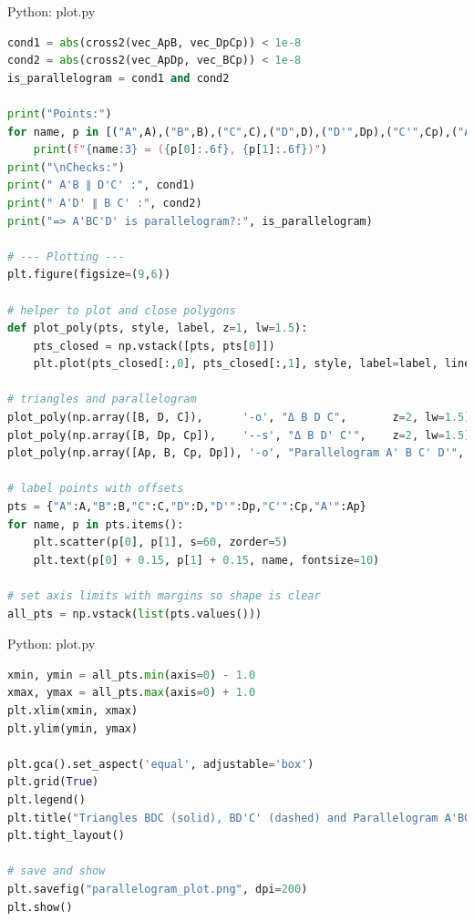\documentclass{beamer}
\numberwithin{equation}{section}
\theoremstyle{remark}
\begin{document}
\begin{frame}[fragile]{Python: plot.py}
\begin{lstlisting}[language=Python]
cond1 = abs(cross2(vec_ApB, vec_DpCp)) < 1e-8
cond2 = abs(cross2(vec_ApDp, vec_BCp)) < 1e-8
is_parallelogram = cond1 and cond2

print("Points:")
for name, p in [("A",A),("B",B),("C",C),("D",D),("D'",Dp),("C'",Cp),("A'",Ap)]:
    print(f"{name:3} = ({p[0]:.6f}, {p[1]:.6f})")
print("\nChecks:")
print(" A'B ∥ D'C' :", cond1)
print(" A'D' ∥ B C' :", cond2)
print("=> A'BC'D' is parallelogram?:", is_parallelogram)

# --- Plotting ---
plt.figure(figsize=(9,6))

# helper to plot and close polygons
def plot_poly(pts, style, label, z=1, lw=1.5):
    pts_closed = np.vstack([pts, pts[0]])
    plt.plot(pts_closed[:,0], pts_closed[:,1], style, label=label, linewidth=lw, zorder=z)

# triangles and parallelogram
plot_poly(np.array([B, D, C]),      '-o', "Δ B D C",       z=2, lw=1.5)
plot_poly(np.array([B, Dp, Cp]),    '--s', "Δ B D' C'",    z=2, lw=1.5)
plot_poly(np.array([Ap, B, Cp, Dp]), '-o', "Parallelogram A' B C' D'", z=3, lw=2)

# label points with offsets
pts = {"A":A,"B":B,"C":C,"D":D,"D'":Dp,"C'":Cp,"A'":Ap}
for name, p in pts.items():
    plt.scatter(p[0], p[1], s=60, zorder=5)
    plt.text(p[0] + 0.15, p[1] + 0.15, name, fontsize=10)

# set axis limits with margins so shape is clear
all_pts = np.vstack(list(pts.values()))
\end{lstlisting}
\end{frame}  

\begin{frame}[fragile]{Python: plot.py}
\begin{lstlisting}[language=Python]
xmin, ymin = all_pts.min(axis=0) - 1.0
xmax, ymax = all_pts.max(axis=0) + 1.0
plt.xlim(xmin, xmax)
plt.ylim(ymin, ymax)

plt.gca().set_aspect('equal', adjustable='box')
plt.grid(True)
plt.legend()
plt.title("Triangles BDC (solid), BD'C' (dashed) and Parallelogram A'BC'D'")
plt.tight_layout()

# save and show
plt.savefig("parallelogram_plot.png", dpi=200)
plt.show()
 \end{lstlisting}
\end{frame}  
\end{document}
